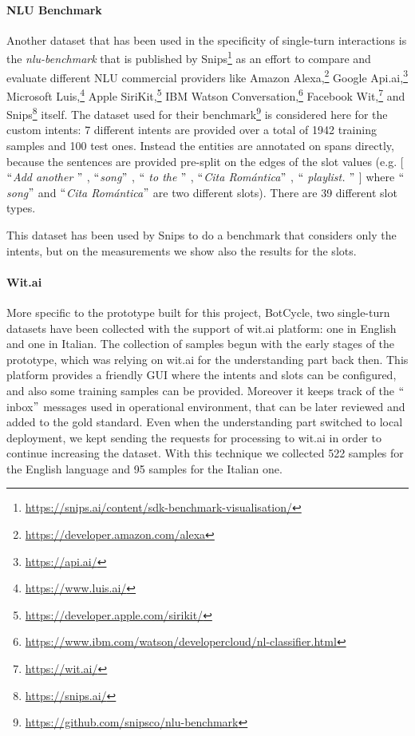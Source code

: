\paragraph{NLU Benchmark}
Another dataset that has been used in the specificity of single-turn interactions is the \textit{nlu-benchmark} that is published by Snips\footnote{\url{https://snips.ai/content/sdk-benchmark-visualisation/}} as an effort to compare and evaluate different NLU commercial providers like Amazon Alexa,\footnote{\url{https://developer.amazon.com/alexa}} Google Api.ai,\footnote{\url{https://api.ai/}} Microsoft Luis,\footnote{\url{https://www.luis.ai/}} Apple SiriKit,\footnote{\url{https://developer.apple.com/sirikit/}} IBM Watson Conversation,\footnote{\url{https://www.ibm.com/watson/developercloud/nl-classifier.html}} Facebook Wit,\footnote{\url{https://wit.ai/}} and Snips\footnote{\url{https://snips.ai/}} itself. The dataset used for their benchmark\footnote{\url{https://github.com/snipsco/nlu-benchmark}} is considered here for the custom intents: 7 different intents are provided over a total of 1942 training samples and 100 test ones. Instead the entities are annotated on spans directly, because the sentences are provided pre-split on the edges of the slot values (e.g. [$``$\textit{Add another }$"$ , $``$\textit{song}$"$ , $``$\textit{ to the }$"$ , $``$\textit{Cita Romántica}$"$ , $``$\textit{ playlist. }$"$ ] where $``$\textit{song}$"$  and $``$\textit{Cita Romántica}$"$  are two different slots). There are 39 different slot types.

This dataset has been used by Snips to do a benchmark that considers only the intents, but on the measurements we show also the results for the slots.

\paragraph{Wit.ai}
More specific to the prototype built for this project, BotCycle, two single-turn datasets have been collected with the support of wit.ai platform: one in English and one in Italian. The collection of samples begun with the early stages of the prototype, which was relying on wit.ai for the understanding part back then. This platform provides a friendly GUI where the intents and slots can be configured, and also some training samples can be provided. Moreover it keeps track of the $``$inbox$"$  messages used in operational environment, that can be later reviewed and added to the gold standard. Even when the understanding part switched to local deployment, we kept sending the requests for processing to wit.ai in order to continue increasing the dataset. With this technique we collected 522 samples for the English language and 95 samples for the Italian one.

